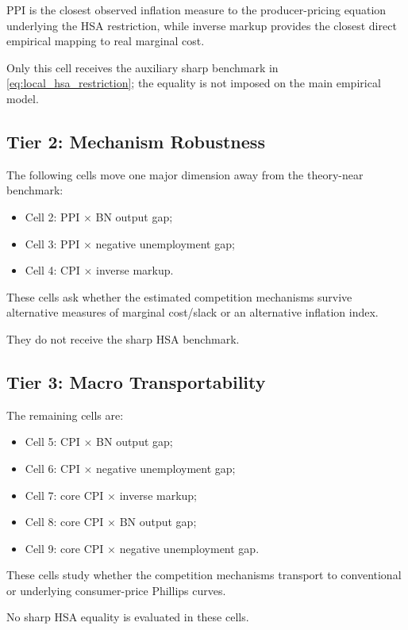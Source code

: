 \documentclass[11pt]{article}
\begin{document}
PPI is the closest observed inflation measure to the producer-pricing equation underlying the HSA restriction, while inverse markup provides the closest direct empirical mapping to real marginal cost.

Only this cell receives the auxiliary sharp benchmark in \cref{eq:local_hsa_restriction}; the equality is not imposed on the main empirical model.

\subsection{Tier 2: Mechanism Robustness}

The following cells move one major dimension away from the theory-near benchmark:
\begin{itemize}
\item Cell 2: PPI \(\times\) BN output gap;
\item Cell 3: PPI \(\times\) negative unemployment gap;
\item Cell 4: CPI \(\times\) inverse markup.
\end{itemize}

These cells ask whether the estimated competition mechanisms survive alternative measures of marginal cost/slack or an alternative inflation index.

They do not receive the sharp HSA benchmark.

\subsection{Tier 3: Macro Transportability}

The remaining cells are:
\begin{itemize}
\item Cell 5: CPI \(\times\) BN output gap;
\item Cell 6: CPI \(\times\) negative unemployment gap;
\item Cell 7: core CPI \(\times\) inverse markup;
\item Cell 8: core CPI \(\times\) BN output gap;
\item Cell 9: core CPI \(\times\) negative unemployment gap.
\end{itemize}

These cells study whether the competition mechanisms transport to conventional or underlying consumer-price Phillips curves.

No sharp HSA equality is evaluated in these cells.

\end{document}
